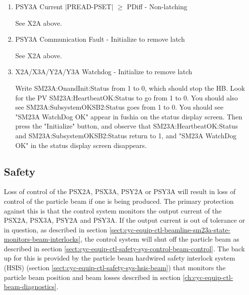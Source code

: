 \documentclass[11pt]{book}		%
\begin{document}
\begin{enumerate}
 \item PSY3A Current $\mid$PREAD-PSET$\mid$  $\geq$ PDiff - Non-latching

\color{red}
See X2A above.
\color{black}

 \item PSY3A Communication Fault - Initialize to remove latch

\color{red}
See X2A above.
\color{black}

 \item X2A/X3A/Y2A/Y3A Watchdog - Initialize to remove latch

\color{red}
Write SM23A:OnandInit:Status from 1 to 0, which should stop the HB. Look for the PV SM23A:HeartbeatOK:Status to go from 1 to 0. You should also see SM23A:SubsystemOKSB2:Status goes from 1 to 0. You should see "SM23A WatchDog OK" appear in fushia on the status display screen. Then press the "Initialize" button, and observe that SM23A:HeartbeatOK:Status and SM23A:SubsystemOKSB2:Status return to 1, and "SM23A WatchDog OK" in the status display screen disappears.
\color{black}

\end{enumerate}


\subsection{Safety}\label{sect:cyc-equip-ctl-beamline-sm23a-safety}

Loss of control of the PSX2A, PSX3A, PSY2A or PSY3A will result in loss of control of the particle beam if one is being produced.  The primary protection against this is that the control system monitors the output current of the PSX2A, PSX3A, PSY2A and PSY3A.  If the output current is out of tolerance or in question, as described in section \ref{sect:cyc-equip-ctl-beamline-sm23a-state-monitors-beam-interlocks}, the control system will shut off the particle beam as described in section \ref{sect:cyc-equip-ctl-safety-sys-control-beam-control}.  The back up for this is provided by the particle beam hardwired safety interlock system (HSIS) (section \ref{sect:cyc-equip-ctl-safety-sys-hsis-beam}) that monitors the particle beam position and beam losses described in section \ref{ch:cyc-equip-ctl-beam-diagnostics}.


\color{red}
\end{document}

